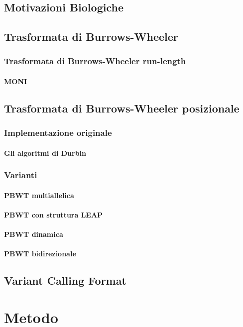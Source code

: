 \documentclass[a4paper,12pt, oneside]{book}
\begin{document}
\section{Motivazioni Biologiche}
\section{Trasformata di Burrows-Wheeler}
\subsection{Trasformata di Burrows-Wheeler run-length}
\subsubsection{MONI}
\section{Trasformata di Burrows-Wheeler posizionale}
\subsection{Implementazione originale}
\subsubsection{Gli algoritmi di Durbin}
\subsection{Varianti}
\subsubsection{PBWT multiallelica}
\subsubsection{PBWT con struttura LEAP}
\subsubsection{PBWT dinamica}
\subsubsection{PBWT bidirezionale}
\section{Variant Calling Format}
\chapter{Metodo}
\end{document}
